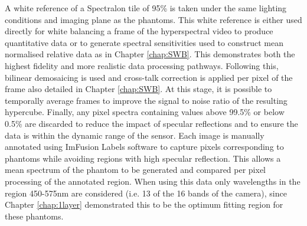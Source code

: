 A white reference of a Spectralon tile of 95\% is taken under the same lighting conditions and imaging plane as the phantoms. This white reference is either used directly for white balancing a frame of the hyperspectral video to produce quantitative data or to generate spectral sensitivities used to construct mean normalised relative data as in Chapter \ref{chap:SWB}. This demonstrates both the highest fidelity and more realistic data processing pathways. Following this, bilinear demosaicing is used and cross-talk correction is applied per pixel of the frame also detailed in Chapter \ref{chap:SWB}. At this stage, it is possible to temporally average frames to improve the signal to noise ratio of the resulting hypercube. Finally, any pixel spectra containing values above 99.5\% or below 0.5\% are discarded to reduce the impact of specular reflections and to ensure the data is within the dynamic range of the sensor. 
Each image is manually annotated using ImFusion Labels software to capture pixels corresponding to phantoms while avoiding regions with high specular reflection. This allows a mean spectrum of the phantom to be generated and compared per pixel processing of the annotated region. When using this data only wavelengths in the region 450-575nm are considered (i.e. 13 of the 16 bands of the camera), since Chapter \ref{chap:1layer} demonstrated this to be the optimum fitting region for these phantoms. 

